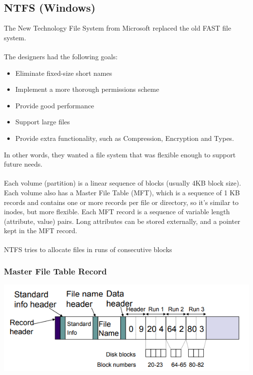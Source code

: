 \documentclass{article}
\begin{document}
\subsection{NTFS (Windows)}

The New Technology File System from Microsoft replaced the old FAST file system.
\\
\\
The designers had the following goals:
\begin{itemize}
    \item Eliminate fixed-size short names
    \item Implement a more thorough permissions scheme
    \item Provide good performance
    \item Support large files
    \item Provide extra functionality, such as Compression, Encryption and Types.
\end{itemize}

In other words, they wanted a file system that was flexible enough to support future needs.
\\
\\
Each volume (partition) is a linear sequence of blocks (usually 4KB block size). Each volume also has a Master File Table (MFT), which is a sequence of 1 KB records and contains one or more records per file or directory, so it's similar to inodes, but more flexible. Each MFT record is a sequence of variable length (attribute, value) pairs. Long attributes can be stored externally, and a pointer kept in the MFT record.
\\
\\
NTFS tries to allocate files in runs of consecutive blocks

\subsubsection{Master File Table Record}

\includegraphics[scale=0.5]{yes3}
\end{document}
